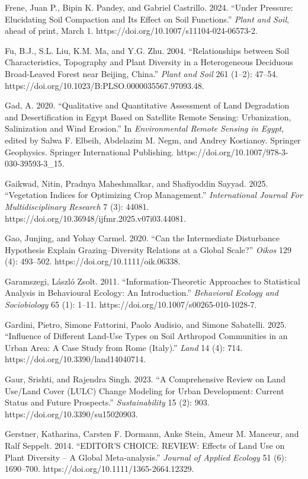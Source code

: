 Frene, Juan P., Bipin K. Pandey, and Gabriel Castrillo. 2024. ``Under Pressure: Elucidating Soil Compaction and Its Effect on Soil Functions.'' \emph{Plant and Soil}, ahead of print, March 1. https://doi.org/10.1007/s11104-024-06573-2.

Fu, B.J., S.L. Liu, K.M. Ma, and Y.G. Zhu. 2004. ``Relationships between Soil Characteristics, Topography and Plant Diversity in a Heterogeneous Deciduous Broad-Leaved Forest near Beijing, China.'' \emph{Plant and Soil} 261 (1--2): 47--54. https://doi.org/10.1023/B:PLSO.0000035567.97093.48.

Gad, A. 2020. ``Qualitative and Quantitative Assessment of Land Degradation and Desertification in Egypt Based on Satellite Remote Sensing: Urbanization, Salinization and Wind Erosion.'' In \emph{Environmental Remote Sensing in Egypt}, edited by Salwa F. Elbeih, Abdelazim M. Negm, and Andrey Kostianoy. Springer Geophysics. Springer International Publishing. https://doi.org/10.1007/978-3-030-39593-3\_15.

Gaikwad, Nitin, Pradnya Maheshmalkar, and Shafiyoddin Sayyad. 2025. ``Vegetation Indices for Optimizing Crop Management.'' \emph{International Journal For Multidisciplinary Research} 7 (3): 44081. https://doi.org/10.36948/ijfmr.2025.v07i03.44081.

Gao, Junjing, and Yohay Carmel. 2020. ``Can the Intermediate Disturbance Hypothesis Explain Grazing--Diversity Relations at a Global Scale?'' \emph{Oikos} 129 (4): 493--502. https://doi.org/10.1111/oik.06338.

Garamszegi, László Zsolt. 2011. ``Information-Theoretic Approaches to Statistical Analysis in Behavioural Ecology: An Introduction.'' \emph{Behavioral Ecology and Sociobiology} 65 (1): 1--11. https://doi.org/10.1007/s00265-010-1028-7.

Gardini, Pietro, Simone Fattorini, Paolo Audisio, and Simone Sabatelli. 2025. ``Influence of Different Land-Use Types on Soil Arthropod Communities in an Urban Area: A Case Study from Rome (Italy).'' \emph{Land} 14 (4): 714. https://doi.org/10.3390/land14040714.

Gaur, Srishti, and Rajendra Singh. 2023. ``A Comprehensive Review on Land Use/Land Cover (LULC) Change Modeling for Urban Development: Current Status and Future Prospects.'' \emph{Sustainability} 15 (2): 903. https://doi.org/10.3390/su15020903.

Gerstner, Katharina, Carsten F. Dormann, Anke Stein, Ameur M. Manceur, and Ralf Seppelt. 2014. ``EDITOR'S CHOICE: REVIEW: Effects of Land Use on Plant Diversity -- A Global Meta‐analysis.'' \emph{Journal of Applied Ecology} 51 (6): 1690--700. https://doi.org/10.1111/1365-2664.12329.

